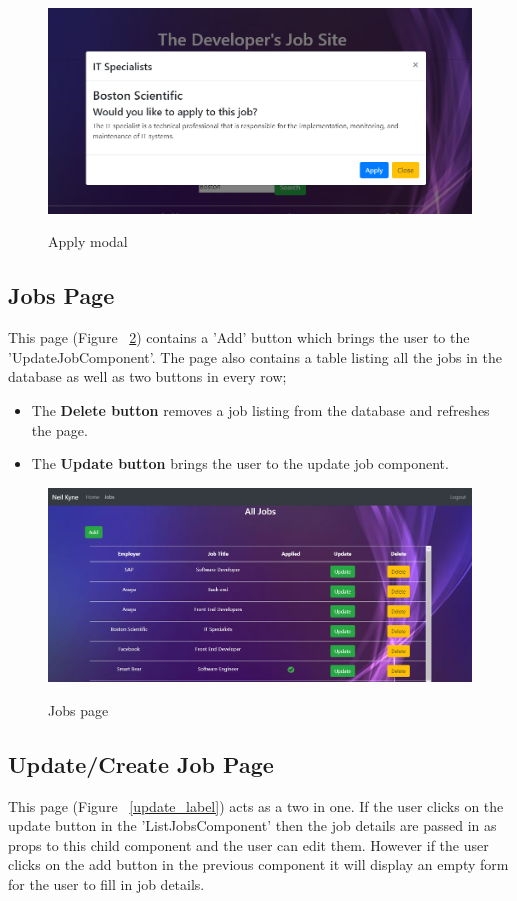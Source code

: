 \begin{figure}[ht]
    \centering
    \includegraphics[scale=0.4]{Images/apply.png} 
    \label{apply_label}
    \caption{Apply modal}
\end{figure}

\subsection{Jobs Page}
This page (Figure ~\ref{jobs_label}) contains a 'Add' button which brings the user to the 'UpdateJobComponent'. The page also contains a table listing all the jobs in the database as well as two buttons in every row;

\begin{itemize}
    \item The \textbf{Delete button} removes a job listing from the database and refreshes the page.
    \item The \textbf{Update button} brings the user to the update job component.
\end{itemize}
\begin{figure}[ht]
    \centering
    \includegraphics[scale=0.3]{Images/jobs.png} 
    \label{jobs_label}
    \caption{Jobs page}
\end{figure}

\subsection{Update/Create Job Page}
This page (Figure ~\ref{update_label}) acts as a two in one. If the user clicks on the update button in the 'ListJobsComponent' then the job details are passed in as props to this child component and the user can edit them. However if the user clicks on the add button in the previous component it will display an empty form for the user to fill in job details.


